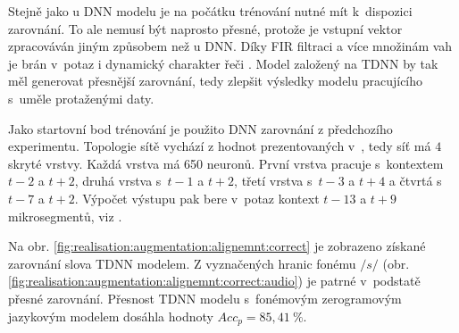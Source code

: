 
Stejně jako u DNN modelu je na počátku trénování nutné mít  k~dispozici zarovnání.
To ale nemusí být naprosto přesné, protože je vstupní vektor zpracováván jiným způsobem než u DNN.
Díky FIR filtraci a více množinám vah je brán v~potaz i dynamický charakter řeči \cite{Peddinti2015}.
Model založený na TDNN by tak měl generovat přesnější zarovnání, tedy zlepšit výsledky modelu pracujícího s~uměle protaženými daty.

Jako startovní bod trénování je použito DNN zarovnání z předchozího experimentu. Topologie sítě vychází z hodnot prezentovaných v~\cite{Peddinti2015}, tedy síť má $4$ skryté vrstvy. Každá vrstva má 650 neuronů. První vrstva pracuje s~kontextem $t-2$ a $t+2$, druhá vrstva s~$t-1$ a $t+2$, třetí vrstva s~$t-3$ a $t+4$ a čtvrtá s~$t-7$ a $t+2$. Výpočet výstupu pak bere v~potaz kontext $t-13$ a $t+9$ mikrosegmentů, viz \cite{Peddinti2015}.


Na obr. \ref{fig:realisation:augmentation:alignemnt:correct} je zobrazeno získané zarovnání slova  TDNN modelem.
Z vyznačených hranic fonému $/s/$ (obr. \ref{fig:realisation:augmentation:alignemnt:correct:audio}) je patrné v~podstatě přesné zarovnání.
Přesnost TDNN modelu s~fonémovým zerogramovým jazykovým modelem dosáhla hodnoty $Acc_{p}= 85,41~\%$.

